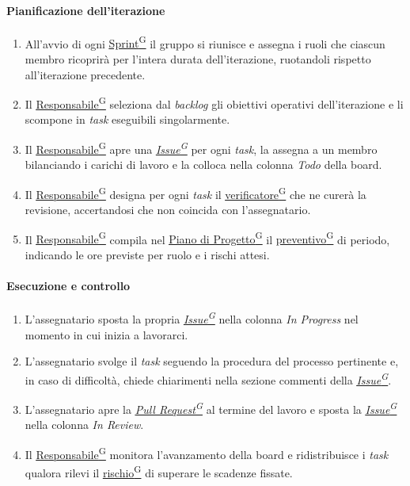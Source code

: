 \documentclass[a4paper,12pt]{article}
\providecommand{\glslink}[2]{\href{https://alittlebyte-19.github.io/Documentazione/glossario.html\#gls-#1}{\underline{#2}\textsuperscript{\scriptsize G}}}
\begin{document}
\paragraph{Pianificazione dell'iterazione}
\begin{enumerate}
    \item All'avvio di ogni \glslink{sprint}{Sprint} il gruppo si riunisce e assegna i ruoli che ciascun membro ricoprirà per l'intera durata dell'iterazione, ruotandoli rispetto all'iterazione precedente.
    \item Il \glslink{responsabile}{Responsabile} seleziona dal \textit{backlog} gli obiettivi operativi dell'iterazione e li scompone in \textit{task} eseguibili singolarmente.
    \item Il \glslink{responsabile}{Responsabile} apre una \textit{\glslink{issue}{Issue}} per ogni \textit{task}, la assegna a un membro bilanciando i carichi di lavoro e la colloca nella colonna \textit{Todo} della board.
    \item Il \glslink{responsabile}{Responsabile} designa per ogni \textit{task} il \glslink{verificatore}{verificatore} che ne curerà la revisione, accertandosi che non coincida con l'assegnatario.
    \item Il \glslink{responsabile}{Responsabile} compila nel \glslink{piano-di-progetto}{Piano di Progetto} il \glslink{preventivo}{preventivo} di periodo, indicando le ore previste per ruolo e i rischi attesi.
\end{enumerate}

\paragraph{Esecuzione e controllo}
\begin{enumerate}
    \item L'assegnatario sposta la propria \textit{\glslink{issue}{Issue}} nella colonna \textit{In Progress} nel momento in cui inizia a lavorarci.
    \item L'assegnatario svolge il \textit{task} seguendo la procedura del processo pertinente e, in caso di difficoltà, chiede chiarimenti nella sezione commenti della \textit{\glslink{issue}{Issue}}.
    \item L'assegnatario apre la \textit{\glslink{pull-request}{Pull Request}} al termine del lavoro e sposta la \textit{\glslink{issue}{Issue}} nella colonna \textit{In Review}.
    \item Il \glslink{responsabile}{Responsabile} monitora l'avanzamento della board e ridistribuisce i \textit{task} qualora rilevi il \glslink{rischio}{rischio} di superare le scadenze fissate.
\end{enumerate}
\end{document}
